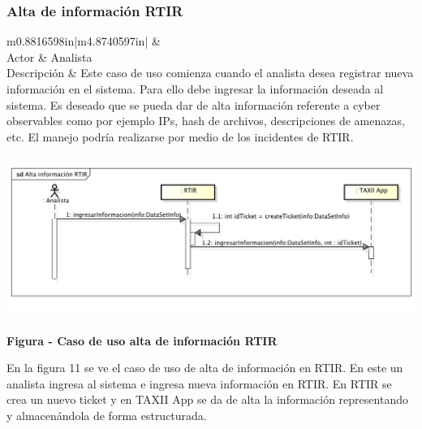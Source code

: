 \subsubsection{Alta de información RTIR}

\begin{flushleft}
	\tablefirsthead{}
	\tablehead{}
	\tabletail{}
	\tablelasttail{}
	\begin{supertabular}{m{0.8816598in}|m{4.8740597in}|}
		 &
		\\\hline
		{ Actor} &
		{ Analista}\\
		{ Descripción} &
		{ Este caso de uso comienza cuando el analista desea registrar nueva información en
			el sistema. Para ello debe ingresar la información deseada al sistema. Es deseado que se pueda dar de alta información
			referente a cyber observables como por ejemplo IPs, hash de archivos, descripciones de amenazas, etc. El manejo podría
			realizarse por medio de los incidentes de RTIR.}\\\hhline{~-}
	\end{supertabular}
\end{flushleft}

\begin{center}
	\includegraphics[width=5.7638in,height=2.0701in]{Analisis22-img/Analisis22-img026.png} 
	{\centering{}\bfseries
		\foreignlanguage{spanish}{Figura }\foreignlanguage{spanish}{ - Caso de uso alta de
			información RTIR}
		\par}
\end{center}
{
	En la figura 11 se ve el caso de uso de alta de información en RTIR. En este un analista ingresa al sistema e ingresa
	nueva información en RTIR. En RTIR se crea un nuevo ticket y en TAXII App se da de alta la información representando y
	almacenándola de forma estructurada.}


